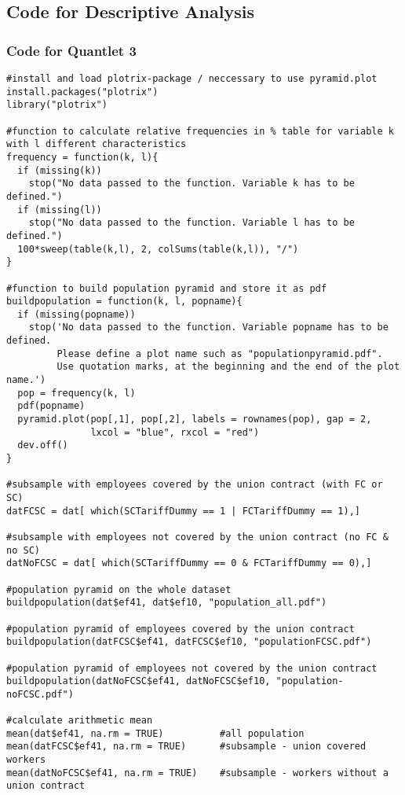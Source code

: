 \subsection{Code for Descriptive Analysis}
\subsubsection{Code for Quantlet 3}
\lstset{firstnumber = 156}
\begin{lstlisting}
#install and load plotrix-package / neccessary to use pyramid.plot
install.packages("plotrix")
library("plotrix")

#function to calculate relative frequencies in % table for variable k with l different characteristics
frequency = function(k, l){            
  if (missing(k))
    stop("No data passed to the function. Variable k has to be defined.")
  if (missing(l))
    stop("No data passed to the function. Variable l has to be defined.")
  100*sweep(table(k,l), 2, colSums(table(k,l)), "/")
}  

#function to build population pyramid and store it as pdf
buildpopulation = function(k, l, popname){
  if (missing(popname))
    stop('No data passed to the function. Variable popname has to be defined.
         Please define a plot name such as "populationpyramid.pdf". 
         Use quotation marks, at the beginning and the end of the plot name.')
  pop = frequency(k, l)
  pdf(popname)
  pyramid.plot(pop[,1], pop[,2], labels = rownames(pop), gap = 2,
               lxcol = "blue", rxcol = "red")
  dev.off() 
}

#subsample with employees covered by the union contract (with FC or SC)
datFCSC = dat[ which(SCTariffDummy == 1 | FCTariffDummy == 1),]

#subsample with employees not covered by the union contract (no FC & no SC)
datNoFCSC = dat[ which(SCTariffDummy == 0 & FCTariffDummy == 0),]

#population pyramid on the whole dataset
buildpopulation(dat$ef41, dat$ef10, "population_all.pdf")

#population pyramid of employees covered by the union contract
buildpopulation(datFCSC$ef41, datFCSC$ef10, "populationFCSC.pdf")

#population pyramid of employees not covered by the union contract
buildpopulation(datNoFCSC$ef41, datNoFCSC$ef10, "population-noFCSC.pdf")

#calculate arithmetic mean
mean(dat$ef41, na.rm = TRUE)          #all population
mean(datFCSC$ef41, na.rm = TRUE)      #subsample - union covered workers
mean(datNoFCSC$ef41, na.rm = TRUE)    #subsample - workers without a union contract


\end{lstlisting}
